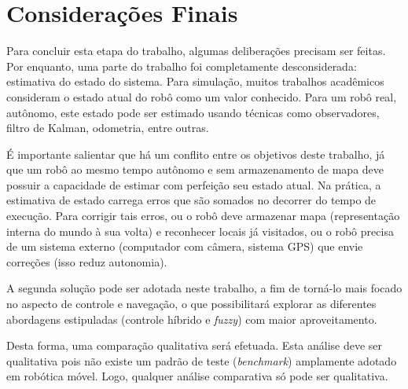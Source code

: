 \chapter{Considerações Finais}
\vspace{-2.5 cm}

Para concluir esta etapa do trabalho, algumas deliberações precisam ser feitas.
Por enquanto, uma parte do trabalho foi completamente desconsiderada: estimativa
do estado do sistema. Para simulação, muitos trabalhos acadêmicos consideram o
estado atual do robô como um valor conhecido. Para um robô real, autônomo, este
estado pode ser estimado usando técnicas como observadores, filtro de Kalman,
odometria, entre outras.

É importante salientar que há um conflito entre os objetivos deste trabalho,
já que um robô ao mesmo tempo autônomo e sem armazenamento de mapa deve possuir
a capacidade de estimar com perfeição seu estado atual. Na prática, a estimativa
de estado carrega erros que são somados no decorrer do tempo de execução. Para
corrigir tais erros, ou o robô deve armazenar mapa (representação interna do
mundo à sua volta) e reconhecer locais já visitados, ou o robô precisa de um
sistema externo (computador com câmera, sistema GPS) que envie correções
(isso reduz autonomia). 

A segunda solução pode ser adotada neste trabalho, a fim de torná-lo mais focado
no aspecto de controle e navegação, o que possibilitará explorar as diferentes
abordagens estipuladas (controle híbrido e \textit{fuzzy}) com maior
aproveitamento. 

Desta forma, uma comparação qualitativa será efetuada. Esta análise
deve ser qualitativa pois não existe um padrão de teste (\textit{benchmark})
amplamente adotado em robótica móvel. Logo, qualquer análise comparativa só pode
ser qualitativa.